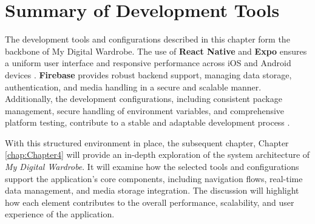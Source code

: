\section{Summary of Development Tools}
The development tools and configurations described in this chapter form the backbone of My Digital Wardrobe. The use of \textbf{ React Native} and \textbf{Expo} ensures a uniform user interface and responsive performance across iOS and Android devices \cite{reactnative}. \textbf{Firebase} provides robust backend support, managing data storage, authentication, and media handling in a secure and scalable manner. Additionally, the development configurations, including consistent package management, secure handling of environment variables, and comprehensive platform testing, contribute to a stable and adaptable development process\cite{reactfirebase} \cite{firebasecookbook}.

With this structured environment in place, the subsequent chapter, Chapter \ref{chap:Chapter4} will provide an in-depth exploration of the system architecture of \textit{ My Digital Wardrobe}. It will examine how the selected tools and configurations support the application's core components, including navigation flows, real-time data management, and media storage integration. The discussion will highlight how each element contributes to the overall performance, scalability, and user experience of the application.


